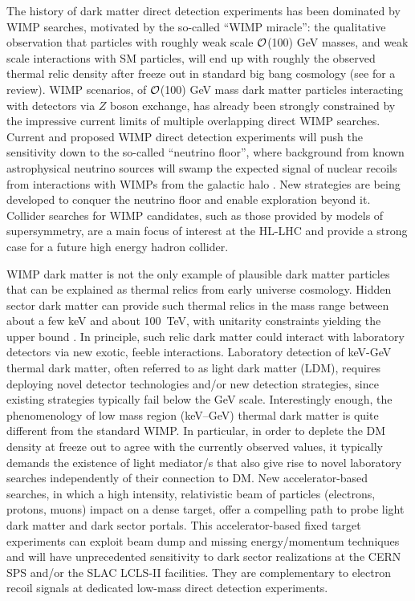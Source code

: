 The history of dark matter direct detection  experiments has been dominated by WIMP searches, motivated by the 
 so-called ``WIMP miracle'': the qualitative observation that particles with roughly weak scale $\cal{O}$(100) GeV masses, and weak scale interactions with SM particles, will end up with roughly the observed thermal relic density after freeze out in standard big bang cosmology (see \cite{Jungman:1995df} for a review). WIMP scenarios, of $\cal{O}$(100) GeV mass dark matter particles interacting with detectors via $Z$ boson exchange, has already been strongly constrained by the impressive current limits of multiple overlapping direct WIMP searches. Current and proposed WIMP direct detection experiments will push the sensitivity %
 down to the so-called ``neutrino floor'', where background from known astrophysical neutrino sources will swamp the expected signal of nuclear recoils from interactions with WIMPs from the galactic halo \cite{Billard:2013qya}. New strategies are being developed to conquer the neutrino floor and enable exploration beyond it.
 Collider searches for  WIMP candidates, such as those provided by models of supersymmetry,  are a main focus of interest at the HL-LHC and provide a strong case for a future high energy hadron collider.

WIMP dark matter is not the only example of plausible dark matter particles that can be explained as thermal relics from early universe cosmology. 
Hidden sector dark matter can provide such thermal relics in the mass range 
between about a few keV \cite{Safarzadeh:2018hhg}  and  about 100~TeV, with unitarity constraints yielding the upper bound \cite{griest:1989wd}. In principle, such relic dark matter could interact with laboratory detectors via new exotic, feeble interactions.
Laboratory detection of keV-GeV thermal dark matter, often referred to as light dark matter (LDM), requires deploying novel detector technologies and/or new detection strategies, since existing strategies typically fail below the GeV scale. 
Interestingly enough, the phenomenology of low mass region (keV--GeV) thermal dark matter is quite different from the standard WIMP. In particular, in order to 
 deplete the DM density at freeze out to agree with the currently observed values, 
it typically demands the existence of light mediator/s 
that also give rise to novel laboratory searches independently of their connection to DM. 
New accelerator-based searches, in which a high intensity, relativistic beam of particles (electrons, protons, muons) impact on a dense target, offer a   compelling path to probe  light dark matter and dark sector portals. This accelerator-based fixed target experiments can exploit beam dump and missing energy/momentum techniques and will have unprecedented sensitivity to dark sector realizations at the CERN SPS and/or the SLAC LCLS-II facilities.  
They are complementary to electron recoil signals at dedicated low-mass direct detection experiments. 

